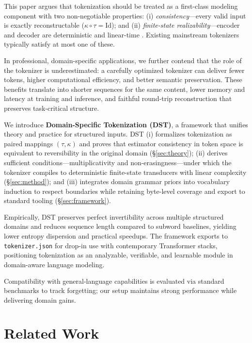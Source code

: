 This paper argues that tokenization should be treated as a first-class modeling component with two non-negotiable properties: (i) \emph{consistency}—every valid input is exactly reconstructable ($\kappa\!\circ\!\tau = \mathrm{Id}$); and (ii) \emph{finite-state realizability}—encoder and decoder are deterministic and linear-time \citep{mohri1997finite}. Existing mainstream tokenizers typically satisfy at most one of these.

In professional, domain-specific applications, we further contend that the role of the tokenizer is underestimated: a carefully optimized tokenizer can deliver fewer tokens, higher computational efficiency, and better semantic preservation. These benefits translate into shorter sequences for the same content, lower memory and latency at training and inference, and faithful round-trip reconstruction that preserves task-critical structure.

We introduce \textbf{Domain-Specific Tokenization (DST)}, a framework that unifies theory and practice for structured inputs. DST (i) formalizes tokenization as paired mappings $(\tau,\kappa)$ and proves that estimator consistency in token space is equivalent to reversibility in the original domain (\S\ref{sec:theory}); (ii) derives sufficient conditions—multiplicativity and non-erasingness—under which the tokenizer compiles to deterministic finite-state transducers with linear complexity (\S\ref{sec:method}); and (iii) integrates domain grammar priors into vocabulary induction to respect boundaries while retaining byte-level coverage and export to standard tooling (\S\ref{sec:framework}).

Empirically, DST preserves perfect invertibility across multiple structured domains and reduces sequence length compared to subword baselines, yielding lower entropy dispersion and practical speedups. The framework exports to \texttt{tokenizer.json} for drop-in use with contemporary Transformer stacks, positioning tokenization as an analyzable, verifiable, and learnable module in domain-aware language modeling.

Compatibility with general-language capabilities is evaluated via standard benchmarks to track forgetting; our setup maintains strong performance while delivering domain gains.

\section{Related Work}
\label{sec:related}

